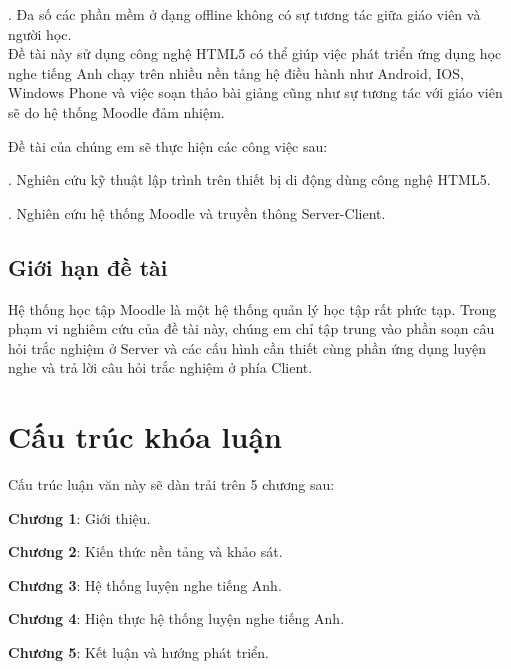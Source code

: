 	. Đa số các phần mềm ở dạng offline không có sự tương tác giữa giáo viên và người học.\\
	
	Đề tài này sử dụng công nghệ HTML5 có thể giúp việc phát triển ứng dụng học nghe tiếng Anh chạy trên nhiều nền tảng hệ điều hành như Android, IOS, Windows Phone và việc soạn thảo bài giảng cũng như sự tương tác với giáo viên sẽ do hệ thống Moodle đảm nhiệm.
	
	Đề tài của chúng em sẽ thực hiện các công việc sau:
	
	. Nghiên cứu kỹ thuật lập trình trên thiết bị di động dùng công nghệ HTML5.
	
	. Nghiên cứu hệ thống Moodle và truyền thông Server-Client.
	

\subsection{Giới hạn đề tài}

	Hệ thống học tập Moodle là một hệ thống quản lý học tập rất phức tạp. Trong phạm vi nghiêm cứu của đề tài này, chúng em chỉ tập trung vào phần soạn câu hỏi trắc nghiệm ở Server và các cấu hình cần thiết cùng phần ứng dụng luyện nghe và trả lời câu hỏi trắc nghiệm ở phía Client.
\newpage
\section{Cấu trúc khóa luận}

	Cấu trúc luận văn này sẽ dàn trải trên 5 chương sau:
	
	\textbf{Chương 1}: Giới thiệu.
	
	\textbf{Chương 2}: Kiến thức nền tảng và khảo sát.
	
	\textbf{Chương 3}: Hệ thống luyện nghe tiếng Anh.
	
	\textbf{Chương 4}: Hiện thực hệ thống luyện nghe tiếng Anh.
	
	\textbf{Chương 5}: Kết luận và hướng phát triển.
